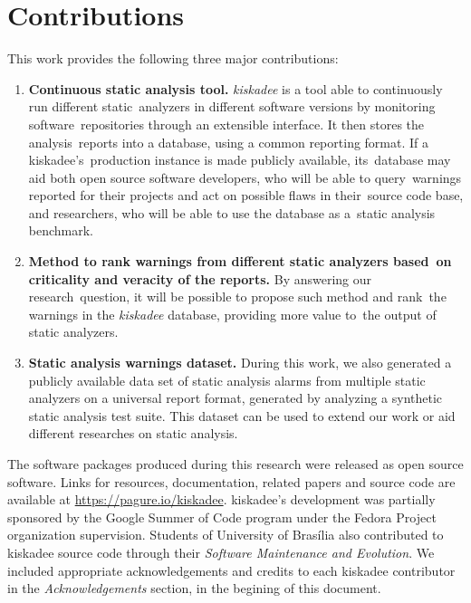 \section{Contributions}
\label{sec:contributions}

This work provides the following three major contributions:

\begin{enumerate}[label=C\arabic*]
  \item \textbf{Continuous static analysis tool.}
    \textit{kiskadee} is a tool able to continuously run different static\
    analyzers in different software versions by monitoring software\
    repositories through an extensible interface. It then stores the analysis\
    reports into a database, using a common reporting format. If a kiskadee's\
    production instance is made publicly available, its\
    database may aid both open source software developers, who will be able to query\
    warnings reported for their projects and act on possible flaws in their\
    source code base, and researchers, who will be able to use the database as a\
    static analysis benchmark.

  \item \textbf{Method to rank warnings from different static analyzers based\
    on criticality and veracity of the reports.} By answering our research\
    question, it will be possible to propose such method and rank\
    the warnings in the \textit{kiskadee} database, providing more value to\
    the output of static analyzers.

  \item \textbf{Static analysis warnings dataset.} During this work, we also
    generated a publicly available data set of static analysis alarms from
    multiple static analyzers on a universal report format, generated by
    analyzing a synthetic static analysis test suite. This dataset can be used
    to extend our work or aid different researches on static analysis.

\end{enumerate}

The software packages produced during this research were released as open
source software. Links for resources, documentation, related papers and source
code are available at \url{https://pagure.io/kiskadee}. kiskadee's development
was partially sponsored by the Google Summer of Code program under the Fedora
Project organization supervision. Students of University of Brasília also
contributed to kiskadee source code through their \textit{Software Maintenance
and Evolution}. We included appropriate acknowledgements and credits to each
kiskadee contributor in the \emph{Acknowledgements} section, in the begining of
this document.

